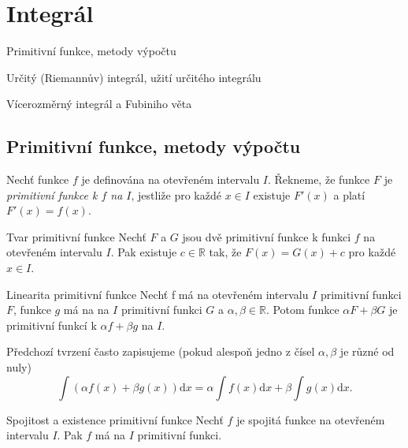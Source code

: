 \def\d{\mathrm{d}}
\def\vol{\mathrm{vol\ }}


\section{Integrál}

\begin{pozadavky}
\begin{pitemize}
	\item Primitivní funkce, metody výpočtu
	\item Určitý (Riemannův) integrál, užití určitého integrálu
	\item Vícerozměrný integrál a Fubiniho věta
\end{pitemize}
\end{pozadavky}

\subsection{Primitivní funkce, metody výpočtu}

\begin{definice}
Nechť funkce $f$ je definována na otevřeném intervalu $I$. Řekneme, že funkce $F$ je \emph{primitivní funkce k $f$ na $I$}, jestliže pro každé $x \in I$ existuje $F'(x)$ a platí $F'(x)=f(x)$.
\end{definice}

\begin{vetaN}{Tvar primitivní funkce}
Nechť $F$ a $G$ jsou dvě primitivní funkce k funkci $f$ na otevřeném intervalu $I$. Pak existuje $c \in \mathbb{R}$ tak, že $F(x)=G(x)+c$ pro každé $x \in I$.
\end{vetaN}

\begin{vetaN}{Linearita primitivní funkce}
Nechť f má na otevřeném intervalu $I$ primitivní funkci $F$, funkce $g$ má na na $I$ primitivní funkci $G$ a $\alpha, \beta \in \mathbb{R}$. Potom funkce $\alpha F + \beta G$ je primitivní funkcí k $\alpha f + \beta g$ na $I$.

\begin{poznamka}
Předchozí tvrzení často zapisujeme (pokud alespoň jedno z čísel $\alpha, \beta$ je různé od nuly)
$$\int (\alpha f(x) + \beta g(x)) \d x = \alpha \int f(x) \d x + \beta \int g(x) \d x.$$
\end{poznamka}
\end{vetaN}

\begin{vetaN}{Spojitost a existence primitivní funkce}
Nechť $f$ je spojitá funkce na otevřeném intervalu $I$. Pak $f$ má na $I$ primitivní funkci.
\end{vetaN}

